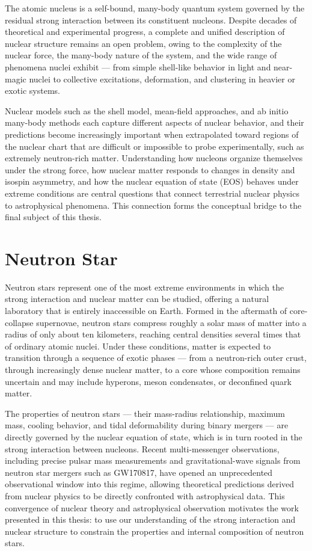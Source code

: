 The atomic nucleus is a self-bound, many-body quantum system governed by the residual strong interaction between its constituent nucleons. Despite decades of theoretical and experimental progress, a complete and unified description of nuclear structure remains an open problem, owing to the complexity of the nuclear force, the many-body nature of the system, and the wide range of phenomena nuclei exhibit — from simple shell-like behavior in light and near-magic nuclei to collective excitations, deformation, and clustering in heavier or exotic systems.

Nuclear models such as the shell model, mean-field approaches, and ab initio many-body methods each capture different aspects of nuclear behavior, and their predictions become increasingly important when extrapolated toward regions of the nuclear chart that are difficult or impossible to probe experimentally, such as extremely neutron-rich matter. Understanding how nucleons organize themselves under the strong force, how nuclear matter responds to changes in density and isospin asymmetry, and how the nuclear equation of state (EOS) behaves under extreme conditions are central questions that connect terrestrial nuclear physics to astrophysical phenomena. This connection forms the conceptual bridge to the final subject of this thesis.

\section{Neutron Star}

Neutron stars represent one of the most extreme environments in which the strong interaction and nuclear matter can be studied, offering a natural laboratory that is entirely inaccessible on Earth. Formed in the aftermath of core-collapse supernovae, neutron stars compress roughly a solar mass of matter into a radius of only about ten kilometers, reaching central densities several times that of ordinary atomic nuclei. Under these conditions, matter is expected to transition through a sequence of exotic phases — from a neutron-rich outer crust, through increasingly dense nuclear matter, to a core whose composition remains uncertain and may include hyperons, meson condensates, or deconfined quark matter.

The properties of neutron stars — their mass-radius relationship, maximum mass, cooling behavior, and tidal deformability during binary mergers — are directly governed by the nuclear equation of state, which is in turn rooted in the strong interaction between nucleons. Recent multi-messenger observations, including precise pulsar mass measurements and gravitational-wave signals from neutron star mergers such as GW170817, have opened an unprecedented observational window into this regime, allowing theoretical predictions derived from nuclear physics to be directly confronted with astrophysical data. This convergence of nuclear theory and astrophysical observation motivates the work presented in this thesis: to use our understanding of the strong interaction and nuclear structure to constrain the properties and internal composition of neutron stars.



